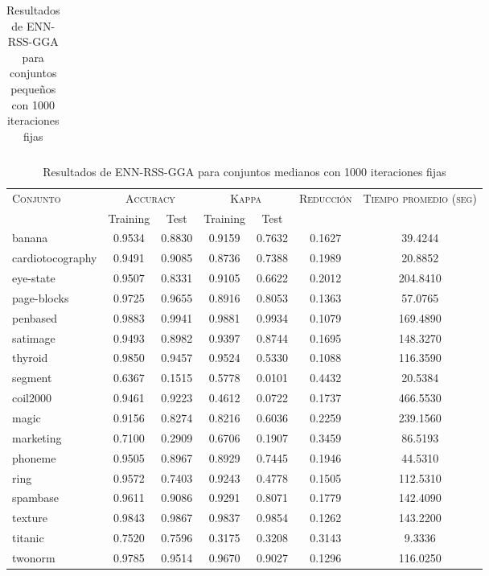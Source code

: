 \begin{table}[]
\begin{tabular}{l c c c c c c}
\hline
\end{tabular}
\caption{Resultados de ENN-RSS-GGA para conjuntos pequeños con 1000 iteraciones fijas}
\label{res-peq-enn-rss-gga}
\end{table}



\begin{table}[]
\centering
\begin{tabular}{l c c c c c c}
\hline
\multirow{2}{*}{\textsc{Conjunto}}
	& \multicolumn{2}{c}{\textsc{Accuracy}}
	& \multicolumn{2}{c}{\textsc{Kappa}}
	& \textsc{Reducción}
	& \textsc{Tiempo promedio (seg)} \\
	& Training & Test
	& Training & Test \\ 
\hline
\hline

banana & 0.9534 & 0.8830 & 0.9159 & 0.7632 & 0.1627 & 39.4244 \\
cardiotocography & 0.9491 & 0.9085 & 0.8736 & 0.7388 & 0.1989 & 20.8852 \\
eye-state & 0.9507 & 0.8331 & 0.9105 & 0.6622 & 0.2012 & 204.8410 \\
page-blocks & 0.9725 & 0.9655 & 0.8916 & 0.8053 & 0.1363 & 57.0765 \\
penbased & 0.9883 & 0.9941 & 0.9881 & 0.9934 & 0.1079 & 169.4890 \\
satimage & 0.9493 & 0.8982 & 0.9397 & 0.8744 & 0.1695 & 148.3270 \\
thyroid & 0.9850 & 0.9457 & 0.9524 & 0.5330 & 0.1088 & 116.3590 \\
segment & 0.6367 & 0.1515 & 0.5778 & 0.0101 & 0.4432 & 20.5384 \\
coil2000 & 0.9461 & 0.9223 & 0.4612 & 0.0722 & 0.1737 & 466.5530 \\
magic & 0.9156 & 0.8274 & 0.8216 & 0.6036 & 0.2259 & 239.1560 \\
marketing & 0.7100 & 0.2909 & 0.6706 & 0.1907 & 0.3459 & 86.5193 \\
phoneme & 0.9505 & 0.8967 & 0.8929 & 0.7445 & 0.1946 & 44.5310 \\
ring & 0.9572 & 0.7403 & 0.9243 & 0.4778 & 0.1505 & 112.5310 \\
spambase & 0.9611 & 0.9086 & 0.9291 & 0.8071 & 0.1779 & 142.4090 \\
texture & 0.9843 & 0.9867 & 0.9837 & 0.9854 & 0.1262 & 143.2200 \\
titanic & 0.7520 & 0.7596 & 0.3175 & 0.3208 & 0.3143 & 9.3336 \\
twonorm & 0.9785 & 0.9514 & 0.9670 & 0.9027 & 0.1296 & 116.0250 \\

\hline
\end{tabular}
\caption{Resultados de ENN-RSS-GGA para conjuntos medianos con 1000 iteraciones fijas}
\label{res-med-enn-rss-gga}
\end{table}



